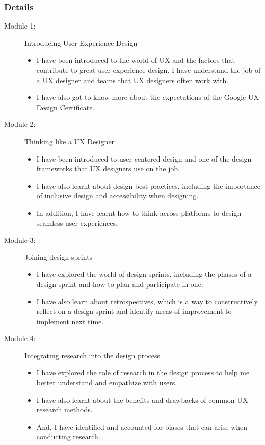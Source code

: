 \subsubsection{Details}
\begin{flushleft}
	\begin{description}
		\item[Module 1:] Introducing User Experience Design
		      \begin{itemize}
			      \item I have been introduced to the world of UX and the factors that contribute to great user experience design. I have understand the job of a UX designer and teams that UX designers often work with.
			      \item I have also got to know more about the expectations of the Google UX Design Certificate.
		      \end{itemize}
		\item[Module 2:] Thinking like a UX Designer
		      \begin{itemize}
			      \item I have been introduced to user-centered design and one of the design frameworks that UX designers use on the job.
			      \item I have also learnt about design best practices, including the importance of inclusive design and accessibility when designing.
			      \item In addition, I have learnt how to think across platforms to design seamless user experiences.
		      \end{itemize}
		\item[Module 3:] Joining design sprints
		      \begin{itemize}
			      \item I have explored the world of design sprints, including the phases of a design sprint and how to plan and participate in one.
			      \item I have also learn about retrospectives, which is a way to constructively reflect on a design sprint and identify areas of improvement to implement next time.
		      \end{itemize}
		\item[Module 4:] Integrating research into the design process
		      \begin{itemize}
			      \item I have explored the role of research in the design process to help me better understand and empathize with users.
			      \item I have also learnt about the benefits and drawbacks of common UX research methods.
			      \item And, I have identified and accounted for biases that can arise when conducting research.
		      \end{itemize}
	\end{description}
\end{flushleft}